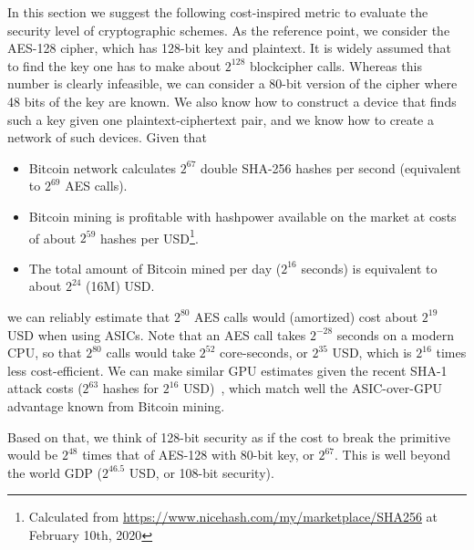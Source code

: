 \documentclass[a4paper]{article}
\begin{document}
In this section we suggest the following cost-inspired metric to evaluate the security level of cryptographic schemes. As the reference point, we consider the AES-128 cipher, which has 128-bit key and plaintext. It is widely assumed that to find the key one has to make about $2^{128}$ blockcipher calls. Whereas this number is clearly infeasible, we can consider a 80-bit version of the cipher where 48 bits of the key are known.  We also know how to construct a device that finds such a key given one plaintext-ciphertext pair, and we know how to create a network of such devices.
Given that
\begin{itemize}
    \item Bitcoin network calculates $2^{67}$ double SHA-256 hashes per second (equivalent to $2^{69}$ AES calls).
    \item Bitcoin mining is profitable with hashpower available on the market at costs of about $2^{59}$ hashes per USD\footnote{Calculated from \url{https://www.nicehash.com/my/marketplace/SHA256} at February 10th, 2020}.
    \item The total amount of Bitcoin mined per day ($2^{16}$ seconds) is equivalent to about $2^{24}$ (16M) USD.
\end{itemize}
we can reliably estimate that $2^{80}$ AES calls would (amortized) cost about  $2^{19}$ USD when using ASICs. Note that an AES call takes $2^{-28}$ seconds on a modern CPU, so that $2^{80}$ calls would take $2^{52}$ core-seconds, or $2^{35}$ USD, which is $2^{16}$ times less cost-efficient. 
We can make similar GPU estimates given the recent SHA-1 attack costs ($2^{63}$ hashes for $2^{16}$ USD)~\cite{cryptoeprint:2020:014}, which match well the ASIC-over-GPU advantage known from Bitcoin mining.

Based on that, we think of 128-bit security as if the cost to break the primitive would be $2^{48}$ times that of AES-128 with 80-bit key, or $2^{67}$. This is well beyond the world GDP ($2^{46.5}$ USD, or 108-bit security). 
\end{document}
